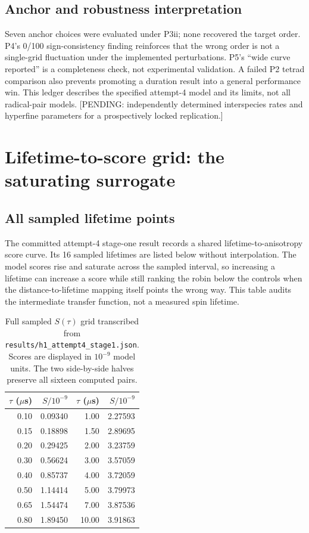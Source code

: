\subsection{Anchor and robustness interpretation}
Seven anchor choices were evaluated under P3ii; none recovered the target order. P4's 0/100 sign-consistency finding reinforces that the wrong order is not a single-grid fluctuation under the implemented perturbations. P5's ``wide curve reported'' is a completeness check, not experimental validation. A failed P2 tetrad comparison also prevents promoting a duration result into a general performance win. This ledger describes the specified attempt-4 model and its limits, not all radical-pair models. [PENDING: independently determined interspecies rates and hyperfine parameters for a prospectively locked replication.]

\section{Lifetime-to-score grid: the saturating surrogate}
\subsection{All sampled lifetime points}
The committed attempt-4 stage-one result records a shared lifetime-to-anisotropy score curve. Its 16 sampled lifetimes are listed below without interpolation. The model scores rise and saturate across the sampled interval, so increasing a lifetime can increase a score while still ranking the robin below the controls when the distance-to-lifetime mapping itself points the wrong way. This table audits the intermediate transfer function, not a measured spin lifetime.\begin{table}[!htbp]\centering\small\caption{Full sampled $S(\tau)$ grid transcribed from \texttt{results/h1\_attempt4\_stage1.json}. Scores are displayed in $10^{-9}$ model units. The two side-by-side halves preserve all sixteen computed pairs.}\begin{tabular}{rrrr}\hline $\tau$ ($\mu$s) & $S/10^{-9}$ & $\tau$ ($\mu$s) & $S/10^{-9}$ \\\hline
0.10 & 0.09340 & 1.00 & 2.27593 \\
0.15 & 0.18898 & 1.50 & 2.89695 \\
0.20 & 0.29425 & 2.00 & 3.23759 \\
0.30 & 0.56624 & 3.00 & 3.57059 \\
0.40 & 0.85737 & 4.00 & 3.72059 \\
0.50 & 1.14414 & 5.00 & 3.79973 \\
0.65 & 1.54474 & 7.00 & 3.87536 \\
0.80 & 1.89450 & 10.00 & 3.91863 \\\hline\end{tabular}\end{table}

